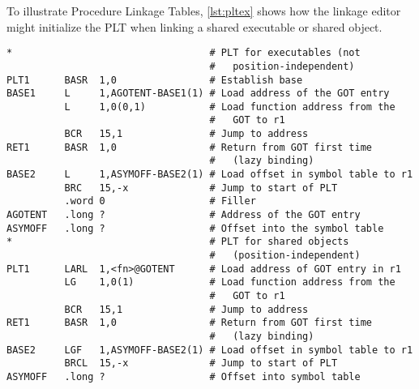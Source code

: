 \documentclass[english,11pt,twoside,toc=bib,toc=idx]{scrreprt}
\begin{document}
To illustrate Procedure Linkage Tables, \cref{lst:pltex} shows how
the linkage editor might initialize the PLT when linking a shared
executable or shared object.

%
%
%
%

\ifzseries
\begin{lstlisting}[style=float,language=simpleasm,
  caption=Procedure Linkage Table example,label=lst:pltex]
*                                  # PLT for executables (not
                                   #   position-independent)
PLT1      BASR  1,0                # Establish base
BASE1     L     1,AGOTENT-BASE1(1) # Load address of the GOT entry
          L     1,0(0,1)           # Load function address from the
                                   #   GOT to r1
          BCR   15,1               # Jump to address
RET1      BASR  1,0                # Return from GOT first time
                                   #   (lazy binding)
BASE2     L     1,ASYMOFF-BASE2(1) # Load offset in symbol table to r1
          BRC   15,-x              # Jump to start of PLT
          .word 0                  # Filler
AGOTENT   .long ?                  # Address of the GOT entry
ASYMOFF   .long ?                  # Offset into the symbol table
*                                  # PLT for shared objects
                                   #   (position-independent)
PLT1      LARL  1,<fn>@GOTENT      # Load address of GOT entry in r1
          LG    1,0(1)             # Load function address from the
                                   #   GOT to r1
          BCR   15,1               # Jump to address
RET1      BASR  1,0                # Return from GOT first time
                                   #   (lazy binding)
BASE2     LGF   1,ASYMOFF-BASE2(1) # Load offset in symbol table to r1
          BRCL  15,-x              # Jump to start of PLT
ASYMOFF   .long ?                  # Offset into symbol table
\end{lstlisting}
\else
\end{document}
